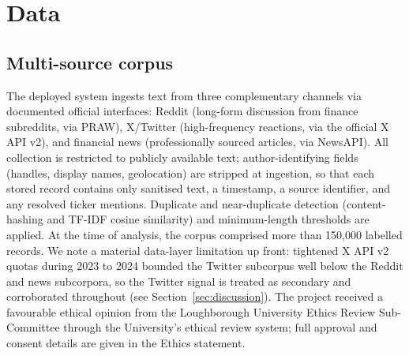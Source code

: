 \documentclass{aims}
\numberwithin{equation}{section}
\begin{document}
\section{Data}\label{sec:data}
\subsection{Multi-source corpus}
The deployed system ingests text from three complementary channels via documented
official interfaces: Reddit (long-form discussion from finance subreddits, via
PRAW), X/Twitter (high-frequency reactions, via the official X API v2), and
financial news (professionally sourced articles, via NewsAPI). All collection is
restricted to publicly available text; author-identifying fields (handles, display
names, geolocation) are stripped at ingestion, so that each stored record contains
only sanitised text, a timestamp, a source identifier, and any resolved ticker
mentions. Duplicate and near-duplicate detection (content-hashing and TF-IDF
cosine similarity) and minimum-length thresholds are applied. At the time of
analysis, the corpus comprised more than 150{,}000 labelled records. We note a
material data-layer limitation up front: tightened X API v2 quotas during
2023 to 2024 bounded the Twitter subcorpus well below the Reddit and news
subcorpora, so the Twitter signal is treated as secondary and corroborated
throughout (see Section~\ref{sec:discussion}). The project received a favourable
ethical opinion from the Loughborough University Ethics Review Sub-Committee through
the University's ethical review system; full approval and consent details are given
in the Ethics statement.
\end{document}
